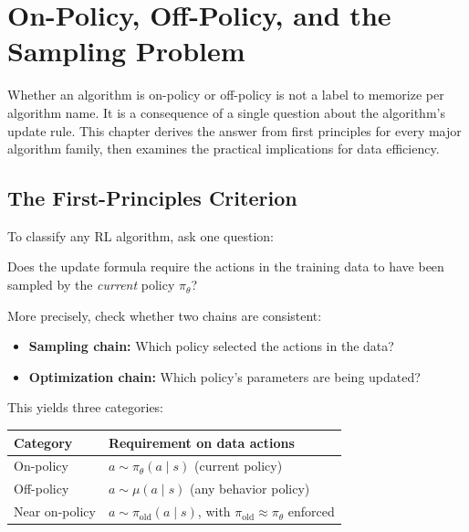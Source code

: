 \chapter{On-Policy, Off-Policy, and the Sampling Problem}
\label{ch:on-off-policy}

Whether an algorithm is on-policy or off-policy is not a label to memorize per algorithm name. It is a consequence of a single question about the algorithm's update rule. This chapter derives the answer from first principles for every major algorithm family, then examines the practical implications for data efficiency.

\section{The First-Principles Criterion}
\label{sec:criterion}

To classify any RL algorithm, ask one question:

\begin{keyidea}
Does the update formula require the actions in the training data to have been sampled by the \emph{current} policy $\pi_\theta$?
\end{keyidea}

More precisely, check whether two chains are consistent:
\begin{itemize}
  \item \textbf{Sampling chain:} Which policy selected the actions in the data?
  \item \textbf{Optimization chain:} Which policy's parameters are being updated?
\end{itemize}

This yields three categories:
\begin{center}
\begin{tabular}{@{} l l @{}}
\toprule
\textbf{Category} & \textbf{Requirement on data actions} \\
\midrule
On-policy & $a \sim \pi_\theta(a \mid s)$ \quad (current policy) \\
Off-policy & $a \sim \mu(a \mid s)$ \quad (any behavior policy) \\
Near on-policy & $a \sim \pi_{\text{old}}(a \mid s)$, with $\pi_{\text{old}} \approx \pi_\theta$ enforced \\
\bottomrule
\end{tabular}
\end{center}

